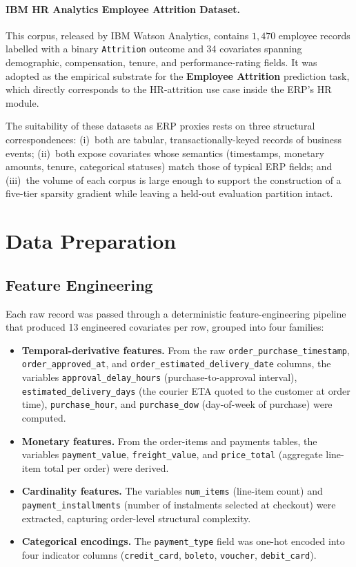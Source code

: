 \paragraph{IBM HR Analytics Employee Attrition Dataset.}
This corpus, released by IBM Watson Analytics, contains $1{,}470$ employee
records labelled with a binary \texttt{Attrition} outcome and 34 covariates
spanning demographic, compensation, tenure, and performance-rating fields. It
was adopted as the empirical substrate for the \textbf{Employee Attrition}
prediction task, which directly corresponds to the HR-attrition use case
inside the ERP's HR module.

The suitability of these datasets as ERP proxies rests on three structural
correspondences: (i)~both are tabular, transactionally-keyed records of
business events; (ii)~both expose covariates whose semantics (timestamps,
monetary amounts, tenure, categorical statuses) match those of typical ERP
fields; and (iii)~the volume of each corpus is large enough to support the
construction of a five-tier sparsity gradient while leaving a held-out
evaluation partition intact.

\section{Data Preparation}
\label{sec:data-prep}

\subsection{Feature Engineering}
\label{subsec:feature-eng}

Each raw record was passed through a deterministic feature-engineering
pipeline that produced 13 engineered covariates per row, grouped into four
families:

\begin{itemize}
    \item \textbf{Temporal-derivative features.} From the raw
    \texttt{order\_purchase\_timestamp},
    \texttt{order\_approved\_at}, and
    \texttt{order\_estimated\_delivery\_date} columns, the variables
    \texttt{approval\_delay\_hours} (purchase-to-approval interval),
    \texttt{estimated\_delivery\_days} (the courier ETA quoted to the
    customer at order time),
    \texttt{purchase\_hour}, and \texttt{purchase\_dow} (day-of-week of
    purchase) were computed.
    \item \textbf{Monetary features.} From the order-items and payments
    tables, the variables \texttt{payment\_value}, \texttt{freight\_value},
    and \texttt{price\_total} (aggregate line-item total per order) were
    derived.
    \item \textbf{Cardinality features.} The variables \texttt{num\_items}
    (line-item count) and \texttt{payment\_installments} (number of
    instalments selected at checkout) were extracted, capturing order-level
    structural complexity.
    \item \textbf{Categorical encodings.} The \texttt{payment\_type} field
    was one-hot encoded into four indicator columns
    (\texttt{credit\_card}, \texttt{boleto}, \texttt{voucher},
    \texttt{debit\_card}).
\end{itemize}

